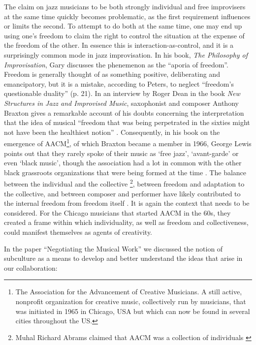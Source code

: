 \documentclass[a4paper]{article}
\begin{document}
The claim on jazz musicians to be both strongly individual and free improvisers at the same time quickly becomes problematic, as the first requirement influences or limits the second. To attempt to do both at the same time, one may end up using one's freedom to claim the right to control the situation at the expense of the freedom of the other. In essence this is interaction-as-control, and it is a surprisingly common mode in jazz improvisation. In his book, \emph{The Philosophy of Improvisation}, Gary \citet{peters09} discusses the phenemenon as the ``aporia of freedom''. Freedom is generally thought of as something positive, deliberating and emancipatory, but it is a mistake, according to Peters, to neglect ``freedom's questionable duality'' (p. 21). In an interview by Roger Dean in the book \emph{New Structures in Jazz and Improvised Music}, saxophonist and composer Anthony Braxton gives a remarkable account of his doubts concerning the interpretation that the idea of musical ``freedom that was being perpetrated in the sixties might not have been the healthiest notion'' \citep[][p. 22]{peters09}. Consequently, in his book on the emergence of  AACM\footnote{The Association for the Advancement of Creative Musicians. A still active, nonprofit organization for creative music, collectively run by musicians, that was initiated in 1965 in Chicago, USA but which can now be found in several cities throughout the US.}, of which Braxton became a member in 1966, George Lewis points out that they rarely spoke of their music as `free jazz', `avant-garde' or even `black music', though the association had a lot in common with the other black grassroots organizations that were being formed at the time \citep[p. 98][]{lewis2008}. The balance between the individual and the collective \footnote{Muhal Richard Abrams claimed that AACM was a collection of individuals \citep[][p. 498]{lewis2008}}, between freedom and adaptation to the collective, and between composer and performer have likely contributed to the internal freedom from freedom itself \citep{peters09}. It is again the context that needs to be considered. For the Chicago musicians that started AACM in the 60s, they created a frame within which individuality, as well as freedom and collectiveness, could manifest themselves as agents of creativity. %

In the paper ``Negotiating the Musical Work'' we discussed the notion of subculture as a means to develop and better understand the ideas that arise in our collaboration:
\end{document}
